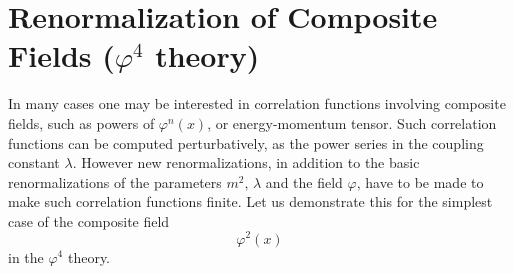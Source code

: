 \section[Renormalization of Composite Fields (\texorpdfstring{$\varphi^4$}{phi**4} theory)]{Renormalization of Composite Fields (\texorpdfstring{$\varphi^4$}{phi**4} theory)}

\newcommand{\insv}[2][]{\dia[0.4]{\draw[prop,wavy] (-2.2,0) -- (0,0);
  \draw[prop] (0,0) -- (1.4,1.4); \draw[prop] (0,0) -- (1.4,-1.4); #2 \node[font=\tiny] at (-2.6,0.45) {#1};}}

In many cases one may be interested in correlation functions involving composite
fields, such as powers of $\varphi^n(x)$, or energy-momentum tensor. Such
correlation functions can be computed perturbatively, as the power series in the
coupling constant $\lambda$. However new renormalizations, in addition to the
basic renormalizations of the parameters $m^2$, $\lambda$ and the field
$\varphi$, have to be made to make such correlation functions finite. Let us
demonstrate this for the simplest case of the composite field
\[
\varphi^2(x)
\]
in the $\varphi^4$ theory.

